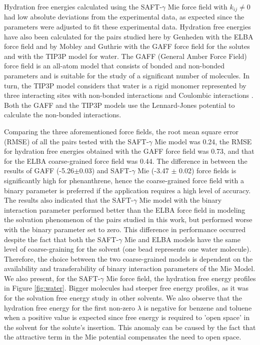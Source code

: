 \documentclass[final,12p,times,twocolumn]{elsarticle}
\begin{document}
	Hydration free energies calculated using the SAFT-$\gamma$ Mie force field with $k_{ij} \neq 0$ had low absolute deviations from the experimental data, as expected since the parameters were adjusted to fit these experimental data. Hydration free energies have also been calculated for the pairs studied here by Genheden \cite{doi:10.1021/acs.jctc.5b00963} with the ELBA force field and by Mobley and Guthrie \cite{PMID:24928188} with the GAFF force field for the solutes and with the TIP3P model for water. The GAFF (General Amber Force Field) force field is an all-atom model that consists of bonded and non-bonded parameters and is suitable for the study of a significant number of molecules. In turn, the TIP3P model considers that water is a rigid monomer represented by three interacting sites with non-bonded interactions and Coulombic interactions \cite{doi:10.1063/1.445869}. Both the GAFF and the TIP3P models use the Lennard-Jones potential to calculate the non-bonded interactions.
	
	Comparing the three aforementioned force fields, the root mean square error (RMSE) of all the pairs tested with the SAFT-$\gamma$ Mie model was  0.24, the RMSE for hydration free energies obtained with the GAFF force field was 0.73, and that for the ELBA coarse-grained force field was 0.44. The difference in between the results of GAFF (-5.26$\pm$0.03) and SAFT-$\gamma$ Mie (-3.47 $\pm$ 0.02) force fields is significantly high for phenanthrene, hence the coarse-grained force field with a binary parameter is preferred if the application requires a high level of accuracy. The results also indicated that the SAFT-$\gamma$ Mie model with the binary interaction parameter performed better than the ELBA force field in modeling the solvation phenomenon of the pairs studied in this work, but performed worse with the binary parameter set to zero. This difference in performance occurred despite the fact that both the SAFT-$\gamma$ Mie and ELBA models have the same level of coarse-graining for the solvent (one bead represents one water molecule). Therefore, the choice between the two coarse-grained models is dependent on the availability and transferability of binary interaction parameters of the Mie Model. We also present, for the SAFT-$\gamma$ Mie force field, the hydration free energy profiles in Figure \ref{fig:water}. Bigger molecules had steeper free energy profiles, as it was for the solvation free energy study in other solvents. We also observe that the hydration free energy for the first non-zero $\lambda$ is negative for benzene and toluene when a positive value is expected since free energy is required to 'open space' in the solvent for the solute's insertion. This anomaly can be caused by the fact that the attractive term in the Mie potential compensates the need to open space. 
	
\end{document}

